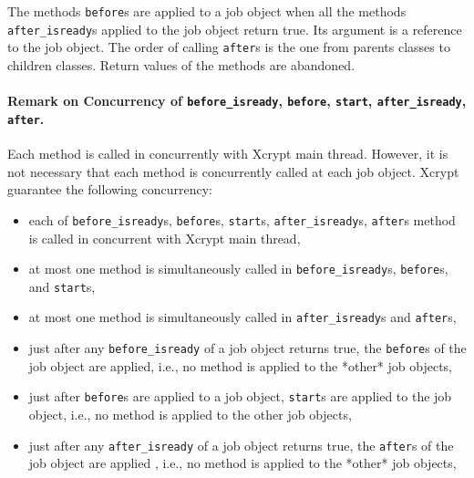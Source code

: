 \documentclass[a4paper,10pt]{report}
\begin{document}
The methods \texttt{before}s are applied to a job object when all the
methods \texttt{after\_isready}s applied to the job object return
true.  Its argument is a reference to the job object.  The order of
calling \texttt{after}s is the one from parents classes to children
classes.  Return values of the methods are abandoned.

\paragraph{Remark on Concurrency of \texttt{before\_isready},
    \texttt{before}, \texttt{start}, \texttt{after\_isready}, \texttt{after}.}
Each method is called in concurrently with Xcrypt main thread.
However, it is not necessary that each method is concurrently called
at each job object.  Xcrypt guarantee the following concurrency:
\begin{itemize}
  \item each of
	\texttt{before\_isready}s, \texttt{before}s, \texttt{start}s,
	\texttt{after\_isready}s, \texttt{after}s
       method is called in concurrent with Xcrypt main thread,
  \item
    at most one method is simultaneously called in
	\texttt{before\_isready}s, \texttt{before}s, and
	\texttt{start}s,
  \item
    at most one method is simultaneously called in
	\texttt{after\_isready}s and \texttt{after}s,
  \item
       just after any \texttt{before\_isready} of a job object returns
	true, the \texttt{before}s of the job object are applied,
	i.e., no method is applied to the *other* job objects,
  \item
       just after \texttt{before}s are applied to a job object,
	\texttt{start}s are applied to the job object, i.e., no method
	is applied to the other job objects,
  \item
       just after any \texttt{after\_isready} of a job object returns
	true, the \texttt{after}s of the job object are applied ,
	i.e., no method is applied to the *other* job objects,
\end{itemize}
\end{document}
